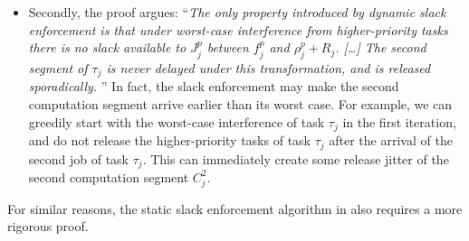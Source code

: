 \begin{itemize}
\begin{itemize}
  \item Secondly, the proof argues: ``\emph{The only property
      introduced by dynamic slack enforcement is that under worst-case
      interference from higher-priority tasks there is no slack
      available to $J_j^p$ between $f_j^p$ and $\rho_j^p + R_j$.
      \emph{[\ldots]} The second segment of $\tau_j$ is never delayed under
      this transformation, and is released sporadically.} '' In fact,
    the slack enforcement may make the second computation segment
    arrive earlier than its worst case. For example, we can greedily
    start with the worst-case interference of task $\tau_j$ in the
    first iteration, and do not release the higher-priority tasks of task $\tau_j$ after the arrival of the second job of task
    $\tau_j$. This can immediately create some release jitter of the
    second computation segment $C_j^2$.
  \end{itemize}
  For similar reasons, the static slack enforcement algorithm in
  \cite{LR:rtas10} also requires a more rigorous proof.
\end{itemize}

\label{sec:correct-solutions} 

